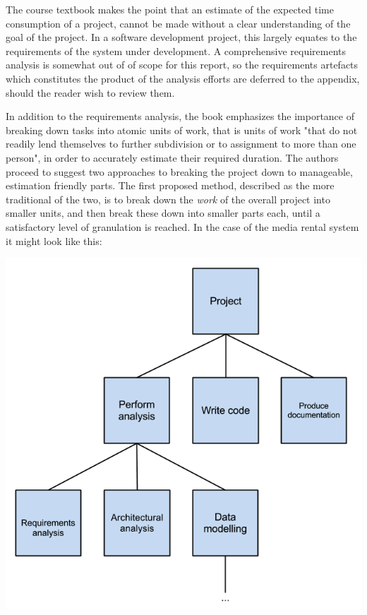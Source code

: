 The course textbook makes the point that an estimate of the expected time consumption of a project, cannot be made without a clear understanding of the goal of the project. In a software development project, this largely equates to the requirements of the system under development. A comprehensive requirements analysis is somewhat out of of scope for this report, so the requirements artefacts which constitutes the product of the analysis efforts are deferred to the appendix, should the reader wish to review them.

In addition to the requirements analysis, the book emphasizes the importance of breaking down tasks into atomic units of work, that is units of work "that do not readily lend themselves to further subdivision or to assignment to more than one person", in order to accurately estimate their required duration. The authors proceed to suggest two approaches to breaking the project down to manageable, estimation friendly parts. The first proposed method, described as the more traditional of the two, is to break down the \textit{work} of the overall project into smaller units, and then break these down into smaller parts each, until a satisfactory level of granulation is reached. In the case of the media rental system it might look like this:

\begin{center}
\includegraphics[scale=0.5]{TaskBreakdown.png}
\end{center}

